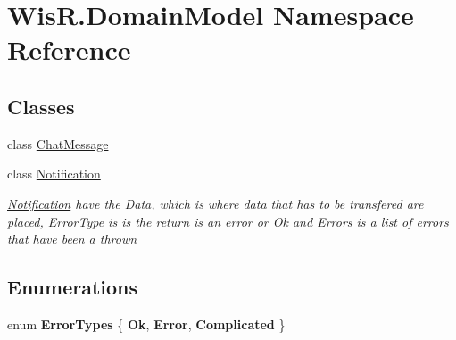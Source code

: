 \hypertarget{namespace_wis_r_1_1_domain_model}{}\section{Wis\+R.\+Domain\+Model Namespace Reference}
\label{namespace_wis_r_1_1_domain_model}
\subsection*{Classes}
\begin{DoxyCompactItemize}
\item 
class \hyperlink{class_wis_r_1_1_domain_model_1_1_chat_message}{Chat\+Message}
\item 
class \hyperlink{class_wis_r_1_1_domain_model_1_1_notification}{Notification}
\begin{DoxyCompactList}\small\item\em \hyperlink{class_wis_r_1_1_domain_model_1_1_notification}{Notification} have the Data, which is where data that has to be transfered are placed, Error\+Type is is the return is an error or Ok and Errors is a list of errors that have been a thrown \end{DoxyCompactList}\end{DoxyCompactItemize}
\subsection*{Enumerations}
\begin{DoxyCompactItemize}
\item 
\hypertarget{namespace_wis_r_1_1_domain_model_afa230428b7139a0887b4c1b13d8ba16a}{}enum {\bfseries Error\+Types} \{ {\bfseries Ok}, 
{\bfseries Error}, 
{\bfseries Complicated}
 \}\label{namespace_wis_r_1_1_domain_model_afa230428b7139a0887b4c1b13d8ba16a}

\end{DoxyCompactItemize}

